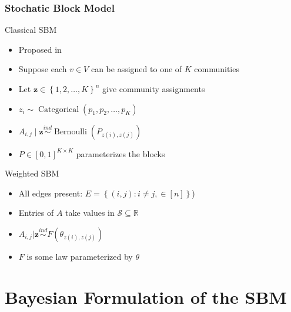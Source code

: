 \documentclass{beamer}
\newcommand{\1}{\mathbbm{1}}
\newcommand{\V}[1]{\ensuremath{\boldsymbol{#1}}} %
\newcommand{\M}[1]{\ensuremath{#1}} %
\begin{document}
\begin{frame}
  \frametitle{Stochatic Block Model}
  \begin{block}{Classical SBM}
    \begin{itemize}
    \item Proposed in \parencite{holland_stochastic_1983}
    \item Suppose each $v \in V$ can be assigned to one of $K$ communities
    \item Let $\V{z} \in \left\{ 1, 2, \ldots, K \right\}^n$ give community assignments
    \item $z_i \sim \operatorname{Categorical}(p_1, p_2, \ldots, p_K)$
    \item $\M{A}_{i,j} \mid \V{z} \overset{ind}{\sim} \operatorname{Bernoulli}(\M{P}_{z(i),z(j)})$
    \item $\M{P} \in \left[ 0, 1 \right]^{K \times K}$ parameterizes the blocks
    \end{itemize}
  \end{block}
  \begin{block}{Weighted SBM}
    \begin{itemize}
    \item All edges present: $E = \left\{ (i,j) : i \neq j, \in [n] \right\}$) 
    \item Entries of $\M{A}$ take values in $\mathcal{S} \subseteq \mathbb{R}$
    \item $\M{A}_{i,j} | \V{z} \overset{ind}{\sim} F(\M{\theta}_{z(i),z(j)})$
    \item $F$ is some law parameterized by $\M{\theta}$
    \end{itemize}
  \end{block}
\end{frame}





\section{Bayesian Formulation of the SBM}
\label{sec:bayes-form-sbm}
\end{document}
